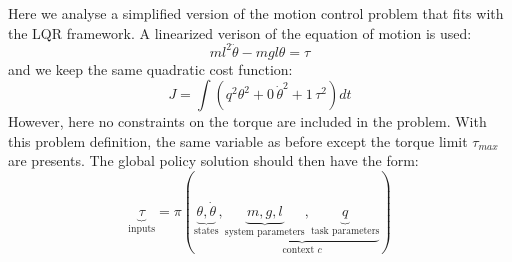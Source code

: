 Here we analyse a simplified version of the motion control problem that fits with the LQR framework. A linearized verison of the equation of motion is used:
\begin{equation}
ml^2 \ddot{\theta} - mgl \theta = \tau
\label{eq:pendulum_dynamics_lqr}
\end{equation}
and we keep the same quadratic cost function:
\begin{equation}
J = \int{( q^2 \theta^2 + 0 \, \dot{\theta}^2 + 1 \, \tau^2 ) dt }
\label{eq:pendulum_cost_lqr}
\end{equation}
However, here no constraints on the torque are included in the problem. With this problem definition, the same variable as before except the torque limit $\tau_{max}$ are presents. The global policy solution should then have the form:
\begin{equation}
\underbrace{\tau}_{\text{inputs}}
=
\pi \left(
\underbrace{ \theta, \dot{\theta} }_{\text{states}},
\underbrace{
\underbrace{ m , g , l }_{\text{system parameters}},
\underbrace{ q }_{\text{task parameters}}
}_{\text{context $c$}}
\right)
\label{eq:lqr_policy_form}
\end{equation}
